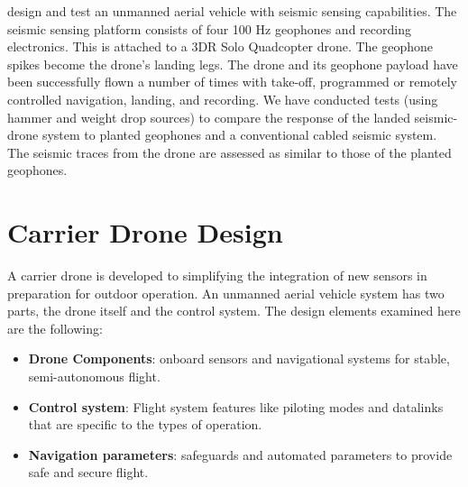 \cite{stewart_chang_sudarchan_becker_huang_2016} \hspace*{0.3cm} \textit{}
\hspace*{0.5cm} design and test an unmanned aerial vehicle with seismic sensing capabilities. The seismic sensing platform consists of four 100 Hz geophones and recording electronics. This is attached to a 3DR Solo Quadcopter drone. The geophone spikes become the drone’s landing legs. The drone and its geophone payload have been successfully flown a number of times with take-off, programmed or remotely controlled navigation, landing, and recording. We have conducted tests (using hammer and weight drop sources) to compare the response of the landed seismic-drone system to planted geophones and a conventional cabled seismic system. The seismic traces from the drone are assessed as similar to those of the planted geophones.



\pagebreak
\section{Carrier Drone Design}



A carrier drone is developed to simplifying the integration of new sensors in preparation for outdoor operation. An unmanned aerial vehicle system has two parts, the drone itself and the control system. The design elements examined here are the following:
\begin{itemize}
    \item \textbf{Drone Components}: onboard sensors and navigational systems for stable, semi-autonomous flight.
    \item \textbf{Control system}: Flight system features like piloting modes and datalinks that are specific to the types of operation.
    \item \textbf{Navigation parameters}: safeguards and automated parameters to provide safe and secure flight.
\end{itemize}

